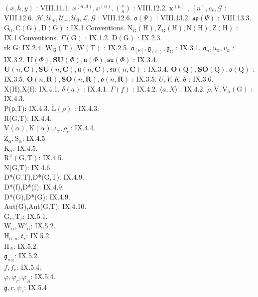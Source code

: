 \((x,h,y)\) : VIII.11.1. \(x^{(n,d)},x^{(n)},\binom{x}{n}\) : VIII.12.2. \(\mathbf{x}^{(n)}\) , \([n],c_r,\mathcal{G}\) : VIII.12.6. \(\mathcal{H},\mathcal{U}_{+},\mathcal{U}_{-},\mathcal{U}_{0},\mathcal{L},\mathcal{G}\) : VIII.12.6. \(\mathfrak{o}(\Psi)\) : VIII.13.2. \(\mathfrak{sp}(\Psi)\) : VIII.13.3. \(\mathrm{G}_0,\mathrm{C}(\mathrm{G}),\mathrm{D}(\mathrm{G})\) : IX.1.Conventions. \(\mathrm{N_G(H),Z_G(H),N(H),Z(H)}\) : IX.1.Conventions. \(\Gamma (\mathrm{G})\) : IX.1.2. \(\tilde{\mathrm{D}} (\mathrm{G})\) : IX.2.3.\\
rk G: IX.2.4. \(\mathrm{W_G(T),W(T)}\) : IX.2.5. \(\mathfrak{a}_{[\mathbb{R}]},\mathfrak{g}_{(\mathbb{C})},\mathfrak{g}_{\mathbb{C}}\) : IX.3.1. \(\mathfrak{a}_u,u_\alpha ,v_\alpha\) : IX.3.2. \(\mathbf{U}(\varPhi),\mathbf{SU}(\varPhi),\mathfrak{u}(\varPhi),\mathfrak{s}\mathfrak{u}(\varPhi)\) : IX.3.4. \(\mathbf{U}(n,\mathbf{C}),\mathbf{SU}(n,\mathbf{C}),\mathfrak{u}(n,\mathbf{C}),\mathfrak{s}\mathfrak{u}(n,\mathbf{C})\) : IX.3.4. \(\mathbf{O}(\mathrm{Q}),\mathbf{SO}(\mathrm{Q}),\mathfrak{o}(\mathrm{Q})\) : IX.3.5. \(\mathbf{O}(n,\mathbf{R}),\mathbf{SO}(n,\mathbf{R}),\mathfrak{o}(n,\mathbf{R})\) : IX.3.5. \(U,V,K,\theta\) : IX.3.6.\\
X(H),X(f): IX.4.1. \(\delta (a)\) : IX.4.1. \(\Gamma (f)\) : IX.4.2. \(\langle a,X\rangle\) : IX.4.2. \(\tilde{\rho},\tilde{\mathrm{V}},\tilde{\mathrm{V}}_{\lambda}(\mathrm{G})\) : IX.4.3.\\
P(ρ,T): IX.4.3. \(\tilde{\mathrm{L}} (\rho)\) : IX.4.3.\\
R(G,T): IX.4.4.\\
\(\mathrm{V}(\alpha),\mathrm{K}(\alpha),\iota_{\alpha},\rho_{\alpha}\): IX.4.4.\\
\(\mathrm{Z}_{\alpha},\mathrm{S}_{\alpha}\): IX.4.5.\\
\(\mathrm{K}_{\alpha}\): IX.4.5.\\
\(\mathrm{R}^{\vee}(\mathrm{G},\mathrm{T})\): IX.4.5.\\
N(G,T): IX.4.6.\\
D*(G,T),D*(G,T): IX.4.9.\\
D*(f),D*(f): IX.4.9.\\
D*(G),D*(G): IX.4.9.\\
Aut(G),Aut(G,T): IX.4.10.\\
\(\mathrm{G}_{r},\mathrm{T}_{r}\): IX.5.1.\\
\(\mathrm{W}_{\alpha},\mathrm{W}'_{\alpha}\): IX.5.2.\\
\(\mathrm{H}_{\alpha,n},t_{r}\): IX.5.2.\\
\(\mathrm{H}_{A}\): IX.5.2.\\
\(\mathfrak{g}_{\mathrm{reg}}\): IX.5.2.\\
\(f,f_{r}\): IX.5.4.\\
\(\varphi,\varphi_{r},\varphi_{A}\): IX.5.4.\\
\(\mathfrak{g},r,\psi_{r}\): IX.5.4

